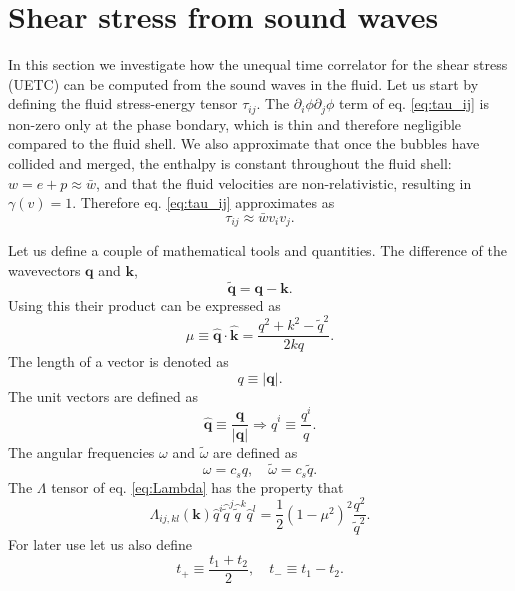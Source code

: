 \section{Shear stress from sound waves}
\label{shear_stress}
In this section we investigate how the unequal time correlator for the shear stress (UETC) can be computed from the sound waves in the fluid.
Let us start by defining the fluid stress-energy tensor $\tau_{ij}$.
The $\partial_i \phi \partial_j \phi$ term of eq. \eqref{eq:tau_ij} is non-zero only at the phase bondary,
which is thin and therefore negligible compared to the fluid shell.
We also approximate that once the bubbles have collided and merged,
the enthalpy is constant throughout the fluid shell: $w = e + p \approx \bar{w}$,
and that the fluid velocities are non-relativistic, resulting in $\gamma(v) = 1$.
Therefore eq. \eqref{eq:tau_ij} approximates as
\cite[eq. 3.12]{hindmarsh_gw_pt_2019}
\begin{equation}
\tau_{ij} \approx \bar{w} v_i v_j.
\label{eq:tau_ij_approx}
\end{equation}

Let us define a couple of mathematical tools and quantities.
The difference of the wavevectors $\mathbf{q}$ and $\mathbf{k}$,
\begin{equation}
\tilde{\mathbf{q}} = \mathbf{q} - \mathbf{k}.
\label{eq:tilde_q}
\end{equation}
Using this their product can be expressed as
\begin{equation}
\mu \equiv \hat{\mathbf{q}} \cdot \hat{\mathbf{k}} = \frac{q^2 + k^2 - \tilde{q}^2}{2kq}.
\label{eq:mu_ssm}
\end{equation}
The length of a vector is denoted as
\begin{equation}
q \equiv |\mathbf{q}|.
\end{equation}
The unit vectors are defined as
\begin{equation}
\hat{\mathbf{q}} \equiv \frac{\mathbf{q}}{|\mathbf{q}|} \Rightarrow
\hat{q}^i \equiv \frac{q^i}{q}.
\end{equation}
The angular frequencies $\omega$ and $\tilde{\omega}$ are defined as
\cite[p. 10]{hindmarsh_gw_pt_2019}
\begin{equation}
\omega = c_s q, \quad \tilde{\omega} = c_s \tilde{q}.
\end{equation}
The $\Lambda$ tensor of eq. \eqref{eq:Lambda} has the property that
\cite[eq. 3.17]{hindmarsh_gw_pt_2019}
\begin{equation}
\Lambda_{ij,kl}(\mathbf{k}) \hat{q}^i \hat{\tilde{q}}^j \hat{\tilde{q}}^k \hat{q}^l = \frac{1}{2}(1 - \mu^2)^2 \frac{q^2}{\tilde{q}^2}.
\end{equation}
For later use let us also define
\cite[p. 11]{hindmarsh_gw_pt_2019}
\begin{equation}
t_+ \equiv \frac{t_1 + t_2}{2}, \quad t_- \equiv t_1 - t_2.
\label{eq:t_plus_minus}
\end{equation}


